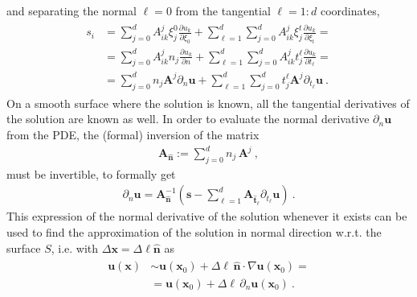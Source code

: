 \documentclass[letterpaper,10pt,english]{jupyterBook}
\begin{document}
\sphinxAtStartPar
and separating the normal \(\ell = 0\) from the tangential \(\ell=1:d\) coordinates,
\begin{equation*}
\begin{split}\begin{aligned}
  s_i
  & = \sum_{j=0}^{d} A^j_{ik} \xi^0_j \frac{\partial u_k}{\partial \xi_0} + \sum_{\ell=1}^{d} \sum_{j=0}^{d} A^j_{ik} \xi^t_j \frac{\partial u_k}{\partial \xi_t} = \\
  & = \sum_{j=0}^{d} A^j_{ik} n_j \frac{\partial u_k}{\partial n} + \sum_{\ell=1}^{d} \sum_{j=0}^{d} A^j_{ik} t^\ell_j \frac{\partial u_k}{\partial t_\ell} = \\
  & = \sum_{j=0}^{d} n_j \mathbf{A}^j \partial_n \mathbf{u} + \sum_{\ell=1}^{d} \sum_{j=0}^{d} t^\ell_j \mathbf{A}^j \partial_{t_\ell} \mathbf{u} \ .
\end{aligned}\end{split}
\end{equation*}
\sphinxAtStartPar
On a smooth surface where the solution is known, all the tangential derivatives of the solution are known as well. In order to evaluate the normal derivative \(\partial_n \mathbf{u}\) from the PDE, the (formal) inversion of the matrix
\begin{equation*}
\begin{split}\mathbf{A}_{\hat{\mathbf{n}}} := \sum_{j=0}^{d} n_j \, \mathbf{A}^j \ ,\end{split}
\end{equation*}
\sphinxAtStartPar
must be invertible, to formally get
\begin{equation*}
\begin{split}\partial_n \mathbf{u} = \mathbf{A}_{\hat{\mathbf{n}}}^{-1} \left( \mathbf{s} - \sum_{\ell=1}^{d} \mathbf{A}_{\hat{\mathbf{t}}_\ell} \partial_{t_\ell} \mathbf{u} \right) \ .\end{split}
\end{equation*}
\sphinxAtStartPar
This expression of the normal derivative of the solution \sphinxhyphen{} whenever it exists \sphinxhyphen{} can be used to find the approximation of the solution in normal direction w.r.t. the surface \(S\), i.e. with \(\Delta \mathbf{x} = \Delta \ell \hat{\mathbf{n}}\) as
\begin{equation*}
\begin{split}\begin{aligned}
  \mathbf{u}(\mathbf{x}) 
  & \sim \mathbf{u}(\mathbf{x}_0) + \Delta \ell \, \hat{\mathbf{n}} \cdot \nabla \mathbf{u}(\mathbf{x}_0) = \\
  & = \mathbf{u}(\mathbf{x}_0) + \Delta \ell \, \partial_{n} \mathbf{u}(\mathbf{x}_0) \ .
\end{aligned}\end{split}
\end{equation*}
\end{document}
